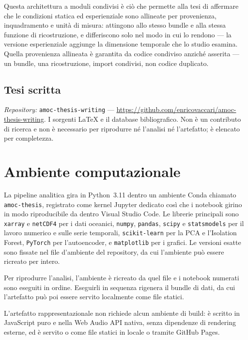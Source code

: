 \noindent Questa architettura a moduli condivisi è ciò che permette alla tesi di affermare che le
condizioni statica ed esperienziale sono allineate per provenienza, inquadramento e unità di misura:
attingono allo stesso bundle e alla stessa funzione di ricostruzione, e differiscono solo nel modo in
cui lo rendono --- la versione esperienziale aggiunge la dimensione temporale che lo studio esamina.
Quella provenienza allineata è garantita da codice condiviso anziché asserita --- un bundle, una
ricostruzione, import condivisi, non codice duplicato.

\subsection*{Tesi scritta}
\textit{Repository:} \texttt{amoc-thesis-writing} ---
\url{https://github.com/enricovaccari/amoc-thesis-writing}. I sorgenti \LaTeX{} e il database
bibliografico. Non è un contributo di ricerca e non è necessario per riprodurre né l'analisi né
l'artefatto; è elencato per completezza.

\section{Ambiente computazionale}
\label{app:c-environment}

La pipeline analitica gira in Python~3.11 dentro un ambiente Conda chiamato
\texttt{amoc-thesis}, registrato come kernel Jupyter dedicato così che i notebook girino in modo
riproducibile da dentro Visual Studio Code. Le librerie principali sono \texttt{xarray} e
\texttt{netCDF4} per i dati oceanici, \texttt{numpy}, \texttt{pandas}, \texttt{scipy} e
\texttt{statsmodels} per il lavoro numerico e sulle serie temporali, \texttt{scikit-learn} per la PCA
e l'Isolation Forest, \texttt{PyTorch} per l'autoencoder, e \texttt{matplotlib} per i grafici. Le
versioni esatte sono fissate nel file d'ambiente del repository, da cui l'ambiente può essere
ricreato per intero.

Per riprodurre l'analisi, l'ambiente è ricreato da quel file e i notebook numerati sono eseguiti in
ordine. Eseguirli in sequenza rigenera il bundle di dati, da cui l'artefatto può poi essere servito
localmente come file statici.

L'artefatto rappresentazionale non richiede alcun ambiente di build: è scritto in JavaScript puro e
nella Web Audio API nativa, senza dipendenze di rendering esterne, ed è servito o come file statici
in locale o tramite GitHub Pages.

